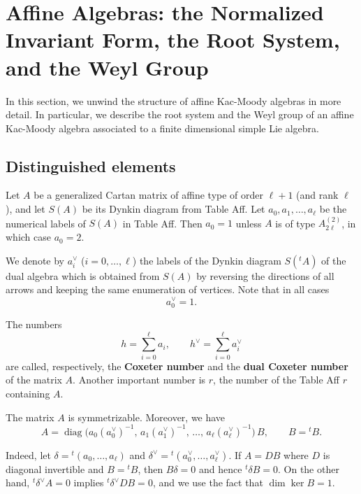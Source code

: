 \documentclass[12pt]{article}
\begin{document}
\section{Affine Algebras: the Normalized Invariant Form, the Root System, and the Weyl Group}
In this section, we unwind the structure of affine Kac-Moody algebras in more detail. In particular, we describe the root system and the Weyl group of an affine Kac-Moody algebra associated to a finite dimensional simple Lie algebra.

\subsection{Distinguished elements}
Let $A$ be a generalized Cartan matrix of affine type of order $\ell+1$ 
(and rank $\ell$), and let $S(A)$ be its Dynkin diagram from Table Aff. 
Let $a_0,a_1,\dots,a_\ell$ be the numerical labels of $S(A)$ in Table Aff. 
Then $a_0=1$ unless $A$ is of type $A_{2\ell}^{(2)}$, in which case $a_0=2$.

We denote by $a_i^\vee$ ($i=0,\dots,\ell$) the labels of the Dynkin diagram 
$S({}^tA)$ of the dual algebra which is obtained from $S(A)$ by reversing the 
directions of all arrows and keeping the same enumeration of vertices. 
Note that in all cases
\[
    a_0^\vee = 1.
\]

\begin{definition}
    The numbers
\[
    h = \sum_{i=0}^\ell a_i,
    \qquad
    h^\vee = \sum_{i=0}^\ell a_i^\vee
\]
are called, respectively, the \textbf{Coxeter number} and the 
\textbf{dual Coxeter number} of the matrix $A$. Another important number is $r$, the number of the Table Aff $r$ containing $A$.
\end{definition}

The matrix $A$ is symmetrizable. Moreover, we have
\begin{equation}
    A = \operatorname{diag}\!\big(a_0 (a_0^\vee)^{-1},\,
    a_1 (a_1^\vee)^{-1},\,\dots,\,
    a_\ell (a_\ell^\vee)^{-1}\big)\, B,
    \qquad B = {}^tB.
\end{equation}

Indeed, let $\delta = {}^t(a_0,\dots,a_\ell)$ and 
$\delta^\vee = {}^t(a_0^\vee,\dots,a_\ell^\vee)$. 
If $A = DB$ where $D$ is diagonal invertible and $B={}^tB$, then 
$B\delta = 0$ and hence ${}^t\delta B=0$. On the other hand, 
${}^t\delta^\vee A=0$ implies ${}^t\delta^\vee DB=0$, and we use the fact that 
$\dim\ker B = 1$.
\end{document}
